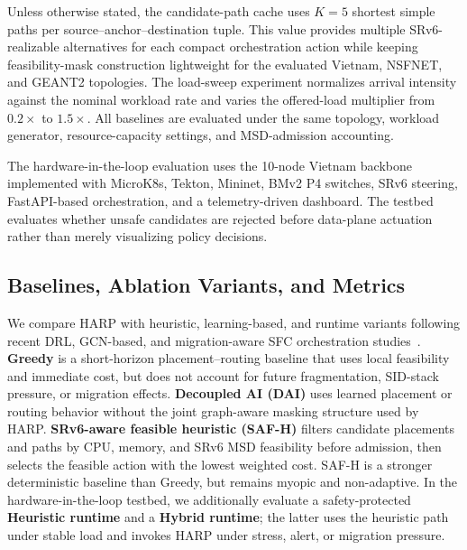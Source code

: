 \documentclass[final,5p]{elsarticle}
\begin{document}
Unless otherwise stated, the candidate-path cache uses \(K=5\) shortest simple paths per source--anchor--destination tuple. This value provides multiple SRv6-realizable alternatives for each compact orchestration action while keeping feasibility-mask construction lightweight for the evaluated Vietnam, NSFNET, and GEANT2 topologies.
The load-sweep experiment normalizes arrival intensity against the nominal workload rate and varies the offered-load multiplier from \(0.2\times\) to \(1.5\times\). All baselines are evaluated under the same topology, workload generator, resource-capacity settings, and MSD-admission accounting.

The hardware-in-the-loop evaluation uses the 10-node Vietnam backbone implemented with MicroK8s, Tekton, Mininet, BMv2 P4 switches, SRv6 steering, FastAPI-based orchestration, and a telemetry-driven dashboard. The testbed evaluates whether unsafe candidates are rejected before data-plane actuation rather than merely visualizing policy decisions.

\subsection{Baselines, Ablation Variants, and Metrics}
\label{subsec:baselines_metrics}
We compare HARP with heuristic, learning-based, and runtime variants following recent DRL, GCN-based, and migration-aware SFC orchestration studies~\cite{xiao2023twostage,liu2024sfcml,addad2022ai,tariq2023fipam,afrasiabi2024cluster}. \textbf{Greedy} is a short-horizon placement--routing baseline that uses local feasibility and immediate cost, but does not account for future fragmentation, SID-stack pressure, or migration effects. \textbf{Decoupled AI (DAI)} uses learned placement or routing behavior without the joint graph-aware masking structure used by HARP. \textbf{SRv6-aware feasible heuristic (SAF-H)} filters candidate placements and paths by CPU, memory, and SRv6 MSD feasibility before admission, then selects the feasible action with the lowest weighted cost. SAF-H is a stronger deterministic baseline than Greedy, but remains myopic and non-adaptive. In the hardware-in-the-loop testbed, we additionally evaluate a safety-protected \textbf{Heuristic runtime} and a \textbf{Hybrid runtime}; the latter uses the heuristic path under stable load and invokes HARP under stress, alert, or migration pressure.
\end{document}
